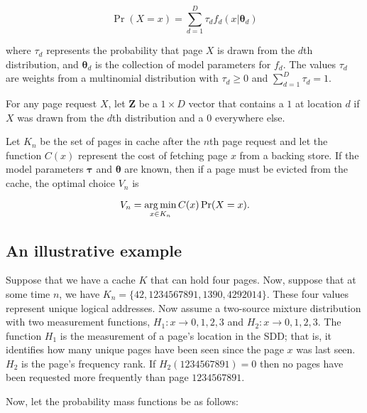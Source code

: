   \begin{equation}
  \label{eq:mixturemodel}
    \Pr(X = x) = \sum_{d=1}^{D} \tau_d f_d(x | \bm{\theta}_d)
  \end{equation}

  \noindent where $\tau_d$ represents the probability that page $X$ is drawn
  from the $d$th distribution, and $\bm{\theta}_d$ is the collection of model
  parameters for $f_d$. The values $\tau_d$ are weights from a multinomial
  distribution with $\tau_d \ge 0$ and $\sum_{d=1}^{D} \tau_d = 1$.

  For any page request $X$, let $\bm{Z}$ be a $1 \times D$ vector that
  contains a $1$ at location $d$ if $X$ was drawn from the $d$th distribution and
  a $0$ everywhere else.

  Let $K_n$ be the set of pages in cache after the $n$th page request and let
  the function $C(x)$ represent the cost of fetching page $x$ from a backing
  store. If the model parameters $\bm{\tau}$ and $\bm{\theta}$ are known,
  then if a page must be evicted from the cache, the optimal choice $V_n$ is

  \begin{equation}
  \label{eq:optimalreplacement}
    V_n = \operatorname*{arg\,min}_{x \in K_n} C(x) \Pr(X = x) .
  \end{equation}

\subsection{An illustrative example}
  Suppose that we have a cache $K$ that can hold four pages. Now, suppose that
  at some time $n$, we have $K_n = \{42, 1234567891, 1390, 4292014\}$. These
  four values represent unique logical addresses. Now assume a
  two-source mixture distribution with two measurement functions, $H_1 : x
  \to {0, 1, 2, 3}$ and $H_2 : x \to {0, 1, 2, 3}$. The function $H_1$ is the
  measurement of a page's location in the SDD; that is, it identifies how many
  unique pages have been seen since the page $x$ was last seen. $H_2$ is the
  page's frequency rank. If $H_2(1234567891) = 0$ then no pages have been
  requested more frequently than page $1234567891$.

  Now, let the probability mass functions be as follows:

